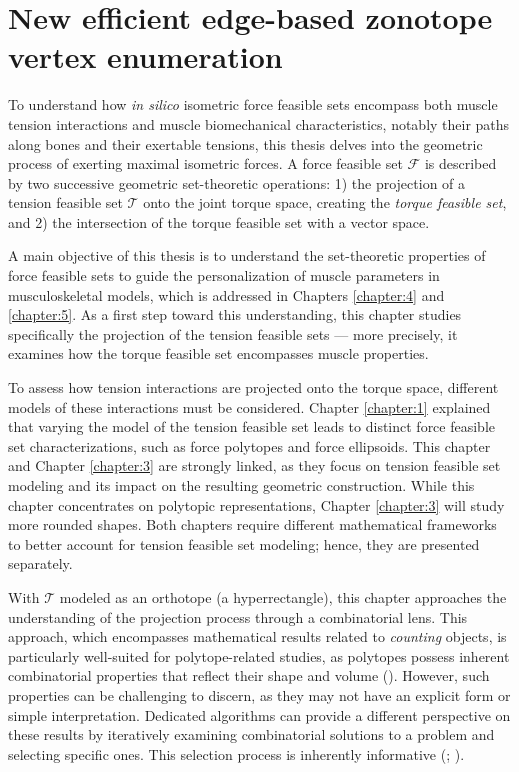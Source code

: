\chapter{New efficient edge-based zonotope vertex enumeration}
\label{chapter:2}
To understand how \emph{in silico} isometric force feasible sets encompass both muscle tension interactions and muscle biomechanical characteristics, notably their paths along bones and their exertable tensions, this thesis delves into the geometric process of exerting maximal isometric forces. A force feasible set $\mathcal{F}$ is described by two successive geometric set-theoretic operations: 1) the projection of a tension feasible set $\mathcal{T}$ onto the joint torque space, creating the \emph{torque feasible set}, and 2) the intersection of the torque feasible set with a vector space. 

A main objective of this thesis is to understand the set-theoretic properties of force feasible sets to guide the personalization of muscle parameters in musculoskeletal models, which is addressed in Chapters \ref{chapter:4} and \ref{chapter:5}. As a first step toward this understanding, this chapter studies specifically the projection of the tension feasible sets — more precisely, it examines how the torque feasible set encompasses muscle properties. 

To assess how tension interactions are projected onto the torque space, different models of these interactions must be considered. Chapter \ref{chapter:1} explained that varying the model of the tension feasible set leads to distinct force feasible set characterizations, such as force polytopes and force ellipsoids. This chapter and Chapter \ref{chapter:3} are strongly linked, as they focus on tension feasible set modeling and its impact on the resulting geometric construction. While this chapter concentrates on polytopic representations, Chapter \ref{chapter:3} will study more rounded shapes. Both chapters require different mathematical frameworks to better account for tension feasible set modeling; hence, they are presented separately. 

With $\mathcal{T}$ modeled as an orthotope (a hyperrectangle), this chapter approaches the understanding of the projection process through a combinatorial lens. This approach, which encompasses mathematical results related to \emph{counting} objects, is particularly well-suited for polytope-related studies, as polytopes possess inherent combinatorial properties that reflect their shape and volume (\cite{grunbaumConvexPolytopes2013}). However, such properties can be challenging to discern, as they may not have an explicit form or simple interpretation. Dedicated algorithms can provide a different perspective on these results by iteratively examining combinatorial solutions to a problem and selecting specific ones. This selection process is inherently informative (\cite{barvinokComputingEhrhartQuasipolynomial2005}; \cite{lopezPolytopeIntersectionHalfspaces2024a}).

